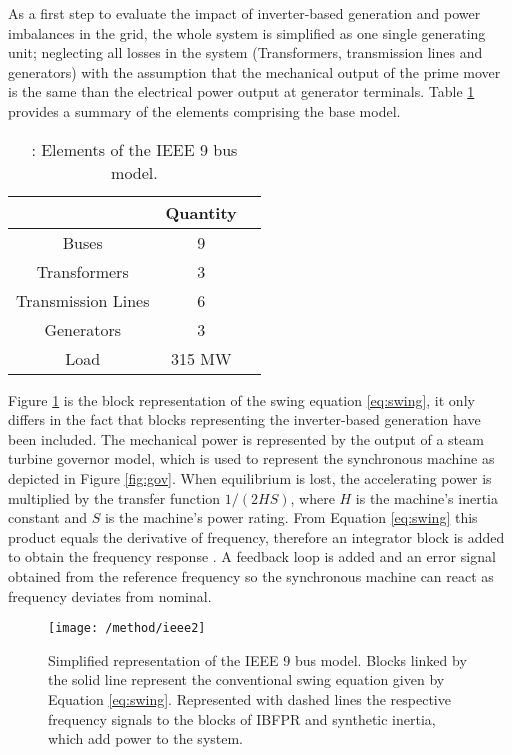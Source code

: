 As a first step to evaluate the impact of inverter-based generation and power imbalances in the grid, the whole system is simplified as one single generating unit; neglecting all losses in the system (Transformers, transmission lines and generators) with the assumption that the mechanical output of the prime mover is the same than the electrical power output at generator terminals. Table \ref{tb:gridelements} provides a summary of the elements comprising the base model.\\




\begin{table}[h]
\caption{\label{tb:gridelements}: Elements of the IEEE 9 bus model.}
\centering
\begin{tabular}{ccc}
\toprule
\textbf{}	& \textbf{Quantity}\\
\midrule
Buses & 9 \\
Transformers & 3 \\
Transmission Lines & 6 \\
Generators & 3 \\
Load & 315 MW \\
\bottomrule
\end{tabular}
\end{table}





Figure \ref{fig:ieeesimple} is the block representation of the swing equation \eqref{eq:swing}, it only differs in the fact that blocks representing the inverter-based generation have been included. The mechanical power is represented by the output of a steam turbine governor model, which is used to represent the synchronous machine as depicted in Figure \ref{fig:gov}. When equilibrium is lost, the accelerating power is multiplied by the transfer function $ 1/(2HS) $, where $ H $ is the machine’s inertia constant and $ S $ is the machine’s power rating. From Equation \eqref{eq:swing} this product equals the derivative of frequency, therefore an integrator block is added to obtain the frequency response \cite{kundur1994power, john1994power, ogata1999ingenieria}. A feedback loop is added and an error signal obtained from the reference frequency so the synchronous machine can react as frequency deviates from nominal.

\begin{figure}[h]
\centering
\texttt{[image: /method/ieee2]}
\caption{Simplified representation of the IEEE 9 bus model. Blocks linked by the solid line represent the conventional swing equation given by Equation \eqref{eq:swing}. Represented with dashed lines the respective frequency signals to the blocks of IBFPR and synthetic inertia, which add power to the system.}
\label{fig:ieeesimple}
\end{figure}


